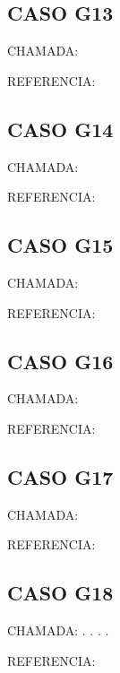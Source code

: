 \documentclass{undftex}
\begin{document}
\begin{refsection}\section*{CASO G13} CHAMADA: \par REFERENCIA:\par\printbibliography[heading=none]\end{refsection}\clearpage
\begin{refsection}\section*{CASO G14} CHAMADA: \par REFERENCIA:\par\printbibliography[heading=none]\end{refsection}\clearpage
\begin{refsection}\section*{CASO G15} CHAMADA: \par REFERENCIA:\par\printbibliography[heading=none]\end{refsection}\clearpage
\begin{refsection}\section*{CASO G16} CHAMADA: \par REFERENCIA:\par\printbibliography[heading=none]\end{refsection}\clearpage
\begin{refsection}\section*{CASO G17} CHAMADA: \par REFERENCIA:\par\printbibliography[heading=none]\end{refsection}\clearpage
\begin{refsection}\section*{CASO G18} CHAMADA: . . . . \par REFERENCIA:\par\printbibliography[heading=none,check=undfconsultadas]\end{refsection}\clearpage
\end{document}
